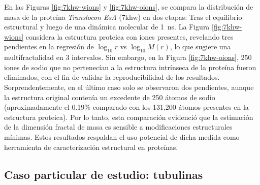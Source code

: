 	En las Figuras \ref{fig:7khw-wions} y \ref{fig:7khw-oions}, se compara la distribuci\'{o}n de masa de la prote\'{i}na \textit{Translocon EsA} (7khw) en dos etapas: Tras el equilibrio estructural y luego de una din\'{a}mica molecular de 1~ns. La Figura \ref{fig:7khw-wions} considera la estructura proteica con iones presentes, revelando tres pendientes en la regresi\'{o}n de $\log_{10}r$ vs $\log_{10}M(r)$, lo que sugiere una multifractalidad en 3 intervalos. Sin embargo, en la Figura \ref{fig:7khw-oions}, 250 iones de sodio que no pertenec\'{i}an a la estructura intr\'{i}nseca de la prote\'{i}na fueron eliminados, con el fin de validar la reproducibilidad de los resultados. Sorprendentemente, en el \'{u}ltimo caso solo se observaron dos pendientes, aunque la estructura original conten\'{i}a  un excedente de 250 \'{a}tomos de sodio (aproximadamente el 0.19\% comparado con los 131,200 \'{a}tomos presentes en la estructura proteica). Por lo tanto, esta comparaci\'{o}n evidenci\'{o} que la estimaci\'{o}n de la dimensi\'{o}n fractal de masa es sensible a modificaciones estructurales m\'{i}nimas. Estos resultados respaldan el uso potencial de dicha medida como herramienta de caracterizaci\'{o}n estructural en prote\'{i}nas. 
	
	
	\subsection*{Caso particular de estudio: tubulinas}
	
